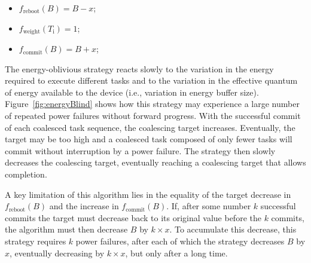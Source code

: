 

\begin{itemize}
\item $f_\text{reboot}(B) = B - x $;
\item $f_\text{weight}(T_\text{i}) =  1$; 
\item $f_\text{commit}(B) = B + x$; 
\end{itemize}

The energy-oblivious strategy reacts slowly to the variation in the energy
required to execute different tasks and to the variation in the effective quantum of
energy available to the device (i.e., variation in energy buffer size). 
%
Figure~\ref{fig:energyBlind} shows how this strategy may experience a 
large number of repeated power failures without forward progress.
%
With the successful commit of each coalesced task sequence, the coalescing
target increases.  Eventually, the target may be too high and a coalesced task
composed of only fewer tasks will commit without interruption by a power
failure.
%
The strategy then slowly decreases the coalescing target, eventually reaching a
coalescing target that allows completion.
%

A key limitation of this algorithm lies in the equality of the target decrease
in $f_\text{reboot}(B)$ and the increase in $f_\text{commit}(B)$.  If, after
some number $k$ successful commits the target must decrease back to its
original value before the $k$ commits, the algorithm must then decrease $B$ by
$k \times x$.  To accumulate this decrease, this strategy requires $k$ power
failures, after each of which the strategy decreases $B$ by $x$, eventually
decreasing by $k \times x$, but only after a long time. 

